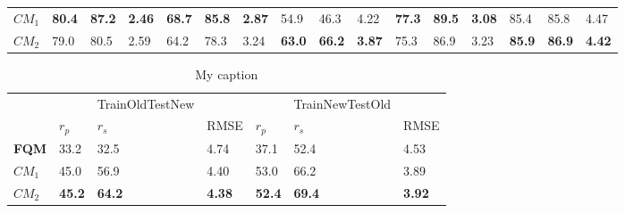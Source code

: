 \begin{table}[]
\begin{tabular}{llllllllllllllll}
$CM_1$                 & \textbf{80.4} & \textbf{87.2}     & \textbf{2.46} & \textbf{68.7} & \textbf{85.8} & \textbf{2.87} & 54.9          & 46.3                          & 4.22          & \textbf{77.3} & \textbf{89.5}      & \textbf{3.08} & 85.4          & 85.8           & 4.47          \\
$CM_2$                 & 79.0          & 80.5              & 2.59          & 64.2          & 78.3          & 3.24          & \textbf{63.0} & \textbf{66.2}                 & \textbf{3.87} & 75.3          & 86.9               & 3.23          & \textbf{85.9} & \textbf{86.9}  & \textbf{4.42}
\end{tabular}
\end{table}
\begin{table}[]
\centering
\caption{My caption}
\label{my-label}
\begin{tabular}{lllllll}
             &               & TrainOldTestNew &               &               & TrainNewTestOld &               \\
             & $r_p$                & $r_s$             & RMSE          & $r_p$                & $r_s$               & RMSE          \\
\textbf{FQM} & 33.2          & 32.5           & 4.74          & 37.1         & 52.4            & 4.53          \\
\textbf{$CM_1$} & 45.0         & 56.9            & 4.40          & 53.0          & 66.2            & 3.89          \\
\textbf{$CM_2$} & \textbf{45.2} & \textbf{64.2}   & \textbf{4.38} & \textbf{52.4} & \textbf{69.4}   & \textbf{3.92}
\end{tabular}
\end{table}